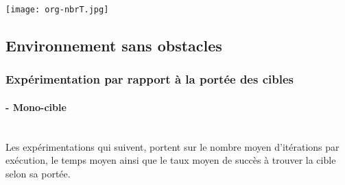 \begin{center}	  
	\texttt{[image: org-nbrT.jpg]}%
	\vspace{-0.1 cm}
	\label{orgNbrT}%
\end{center}



 
 
\subsection{Environnement sans obstacles}
\subsubsection{Expérimentation par rapport à la portée des cibles}

\paragraph{- Mono-cible}
\textbf{ }\\
Les expérimentations qui suivent, portent sur le nombre moyen d'itérations par exécution, le temps moyen ainsi que le taux moyen de succès à trouver la cible selon sa portée.



